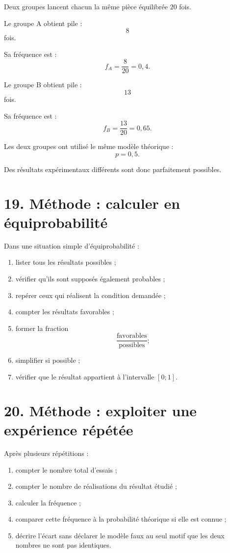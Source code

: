 Deux groupes lancent chacun la même pièce équilibrée $20$ fois.

Le groupe A obtient pile :
\[
8
\]
fois.

Sa fréquence est :
\[
f_A=\dfrac8{20}=0{,}4.
\]

Le groupe B obtient pile :
\[
13
\]
fois.

Sa fréquence est :
\[
f_B=\dfrac{13}{20}=0{,}65.
\]

Les deux groupes ont utilisé le même modèle théorique :
\[
p=0{,}5.
\]

Des résultats expérimentaux différents sont donc parfaitement possibles.

\section{19. Méthode : calculer en équiprobabilité}

\begin{methode}
Dans une situation simple d'équiprobabilité :
\begin{enumerate}
\item lister tous les résultats possibles ;
\item vérifier qu'ils sont supposés également probables ;
\item repérer ceux qui réalisent la condition demandée ;
\item compter les résultats favorables ;
\item former la fraction
\[
\dfrac{\text{favorables}}{\text{possibles}};
\]
\item simplifier si possible ;
\item vérifier que le résultat appartient à l'intervalle $[0;1]$.
\end{enumerate}
\end{methode}

\section{20. Méthode : exploiter une expérience répétée}

\begin{methode}
Après plusieurs répétitions :
\begin{enumerate}
\item compter le nombre total d'essais ;
\item compter le nombre de réalisations du résultat étudié ;
\item calculer la fréquence ;
\item comparer cette fréquence à la probabilité théorique si elle est connue ;
\item décrire l'écart sans déclarer le modèle faux au seul motif que les deux nombres ne sont pas identiques.
\end{enumerate}
\end{methode}

